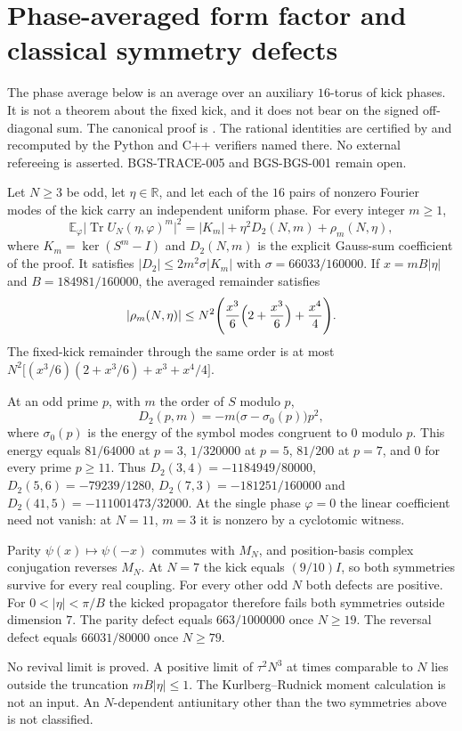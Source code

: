 \section{Phase-averaged form factor and classical symmetry defects}
\label{sec:interaction-phase-form-factor}
The phase average below is an average over an auxiliary \(16\)-torus of kick
phases. It is not a theorem about the fixed kick, and it does not bear on
the signed off-diagonal sum. The canonical proof is
.
The rational identities are certified by
 and recomputed by the
Python and C++ verifiers named there. No external refereeing is asserted.
BGS-TRACE-005 and BGS-BGS-001 remain open.

\begin{theorem}
\label{thm:interaction-phase-form-factor}
Let \(N\ge 3\) be odd, let \(\eta\in\mathbb R\), and let each of the \(16\)
pairs of nonzero Fourier modes of the kick carry an independent uniform phase.
For every integer \(m\ge 1\),
\[
\mathbb E_\varphi\lvert\operatorname{Tr} U_N(\eta,\varphi)^m\rvert^2
=\lvert K_m\rvert+\eta^2 D_2(N,m)+\rho_m(N,\eta),
\]
where \(K_m=\ker(S^m-I)\) and \(D_2(N,m)\) is the explicit Gauss-sum
coefficient of the proof. It satisfies
\(\lvert D_2\rvert\le 2m^2\sigma\lvert K_m\rvert\) with
\(\sigma=66033/160000\). If \(x=m B\lvert\eta\rvert\) and
\(B=184981/160000\), the averaged remainder satisfies
\[
\lvert\rho_m(N,\eta)\rvert
\le N^2\Biggl(\frac{x^3}{6}\Bigl(2+\frac{x^3}{6}\Bigr)+\frac{x^4}{4}\Biggr).
\]
The fixed-kick remainder through the same order is at most
\(N^2\bigl[(x^3/6)(2+x^3/6)+x^3+x^4/4\bigr]\).

At an odd prime \(p\), with \(m\) the order of \(S\) modulo \(p\),
\[
D_2(p,m)=-m\bigl(\sigma-\sigma_0(p)\bigr)p^2,
\]
where \(\sigma_0(p)\) is the energy of the symbol modes congruent to \(0\)
modulo \(p\). This energy equals \(81/64000\) at \(p=3\), \(1/320000\) at
\(p=5\), \(81/200\) at \(p=7\), and \(0\) for every prime \(p\ge 11\).
Thus \(D_2(3,4)=-1184949/80000\), \(D_2(5,6)=-79239/1280\),
\(D_2(7,3)=-181251/160000\) and \(D_2(41,5)=-111001473/32000\).
At the single phase \(\varphi=0\) the linear
coefficient need not vanish: at \(N=11\), \(m=3\) it is nonzero by a
cyclotomic witness.

Parity \(\psi(x)\mapsto\psi(-x)\) commutes with \(M_N\), and position-basis
complex conjugation reverses \(M_N\). At \(N=7\) the kick equals \((9/10)I\),
so both symmetries survive for every real coupling. For every other odd
\(N\) both defects are positive. For \(0<\lvert\eta\rvert<\pi/B\) the kicked
propagator therefore fails both symmetries outside dimension \(7\). The
parity defect equals \(663/1000000\) once \(N\ge 19\). The reversal defect
equals \(66031/80000\) once \(N\ge 79\).

No revival limit is proved. A positive limit of \(\tau^2 N^3\) at times
comparable to \(N\) lies outside the truncation \(m B\lvert\eta\rvert\le 1\).
The Kurlberg--Rudnick moment calculation is not an input. An \(N\)-dependent
antiunitary other than the two symmetries above is not classified.
\end{theorem}
